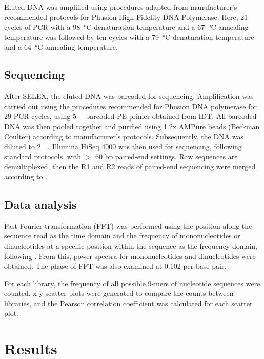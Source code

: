 \documentclass[parskip=full, numbers=noenddot]{scrreprt}
\begin{document}
Eluted DNA was amplified using procedures adapted from manufacturer's recommended protocols for Phusion High-Fidelity DNA Polymerase.  Here, 21 cycles of PCR with a \SI{98}{\celsius} denaturation temperature and a \SI{67}{\celsius} annealing temperature was followed by ten cycles with a \SI{79}{\celsius} denaturation temperature and a \SI{64}{\celsius} annealing temperature.

\subsection{Sequencing}
\label{ssec:emsaselex_methods_seq}

After SELEX, the eluted DNA was barcoded for sequencing.  Amplification was carried out using the procedures recommended for Phusion DNA polymerase for 29 PCR cycles, using \SI{5}{\micro\Molar} barcoded PE primer obtained from IDT.  All barcoded DNA was then pooled together and purified using 1.2x AMPure beads (Beckman Coulter) according to manufacturer's protocols.  Subsequently, the DNA was diluted to \SI{2}{\nano\Molar}.  Illumina HiSeq 4000 was then used for sequencing, following standard protocols, with $>$ 60 bp paired-end settings.  Raw sequences are demultiplexed, then the R1 and R2 reads of paired-end sequencing were merged according to \citet{zhu_interaction_2018}.

\subsection{Data analysis}
\label{ssec:emsaselex_methods_anal}

Fast Fourier transformation (FFT) was performed using the position along the sequence read as the time domain and the frequency of mononucleotides or dinucleotides at a specific position within the sequence as the frequency domain, following \citet{zhu_interaction_2018}.  From this, power spectra for mononucleotides and dinucleotides were obtained.  The phase of FFT was also examined at 0.102 per base pair.

For each library, the frequency of all possible 9-mers of nucleotide sequences were counted.  x-y scatter plots were generated to compare the counts between libraries, and the Pearson correlation coefficient was calculated for each scatter plot.

\section{Results}
\label{sec:emsaselex_results}
\end{document}
